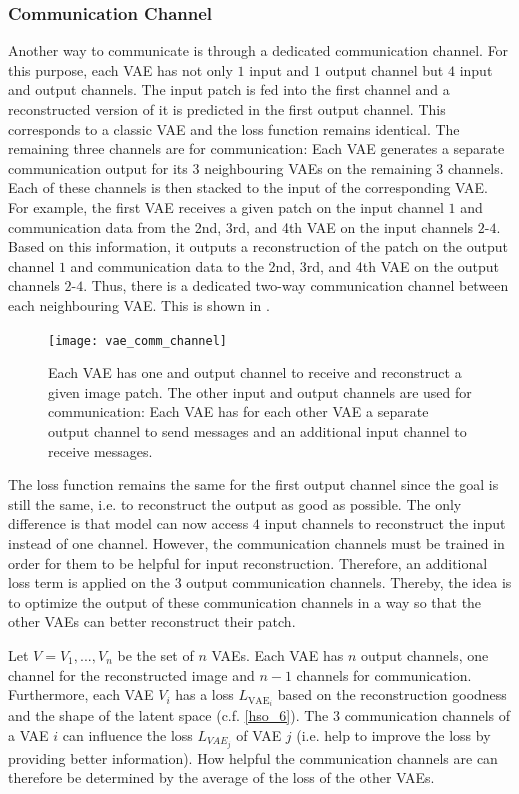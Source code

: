 \subsubsection{Communication Channel}
Another way to communicate is through a dedicated communication channel. For this purpose, each VAE has not only $1$ input and $1$ output channel but $4$ input and output channels. The input patch is fed into the first channel and a reconstructed version of it is predicted in the first output channel. This corresponds to a classic VAE and the loss function remains identical.
The remaining three channels are for communication: Each VAE generates a separate communication output for its $3$ neighbouring VAEs on the remaining $3$ channels. Each of these channels is then stacked to the input of the corresponding VAE. For example, the first VAE receives a given patch on the input channel $1$ and communication data from the 2nd, 3rd, and 4th VAE on the input channels $2$-$4$. Based on this information, it outputs a reconstruction of the patch on the output channel $1$ and communication data to the 2nd, 3rd, and 4th VAE on the output channels $2$-$4$. Thus, there is a dedicated two-way communication channel between each neighbouring VAE. This is shown in .


\begin{figure}[h]
    \centering
    \texttt{[image: vae\_comm\_channel]}
    \caption[Communication between VAEs with a dedicated communication channel]{Each VAE has one and output channel to receive and reconstruct a given image patch. The other input and output channels are used for communication: Each VAE has for each other VAE a separate output channel to send messages and an additional input channel to receive messages.}
\end{figure}

The loss function remains the same for the first output channel since the goal is still the same, i.e. to reconstruct the output as good as possible. The only difference is that model can now access $4$ input channels to reconstruct the input instead of one channel. However, the communication channels must be trained in order for them to be helpful for input reconstruction. Therefore, an additional loss term is applied on the $3$ output communication channels. Thereby, the idea is to optimize the output of these communication channels in a way so that the other VAEs can better reconstruct their patch.

Let $V = {V_1, ..., V_n}$ be the set of $n$ VAEs. Each VAE has $n$ output channels, one channel for the reconstructed image and $n-1$ channels for communication. Furthermore, each VAE $V_i$ has a loss $L_{\text{VAE}_i}$ based on the reconstruction goodness and the shape of the latent space (c.f. \eqref{hso_6}). The $3$ communication channels of a VAE $i$ can influence the loss $L_{VAE_j}$ of VAE $j$ (i.e. help to improve the loss by providing better information). How helpful the communication channels are can therefore be determined by the average of the loss of the other VAEs.

